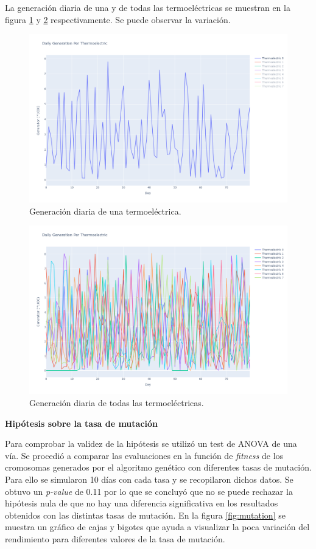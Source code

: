 \documentclass[twocolumn, fontsize=10pt]{article}
\begin{document}
La generación diaria de una y de todas las termoeléctricas se muestran en la figura \ref{fig:dailygenone} y \ref{fig:dailygenall} respectivamente. Se puede observar la variación.

\begin{figure}[H]
  \centering
  \includegraphics[width=\columnwidth]{assets/dailygenone.png}
  \caption{Generación diaria de una termoeléctrica.}
  \label{fig:dailygenone}
  \end{figure}

  \begin{figure}[H]
    \centering
    \includegraphics[width=\columnwidth]{assets/dailygenall.png}
    \caption{Generación diaria de todas las termoeléctricas.}
    \label{fig:dailygenall}
    \end{figure}

\textbf{Hipótesis sobre la tasa de mutación}

Para comprobar la validez de la hipótesis se utilizó un test de ANOVA de una vía. Se procedió a comparar 
las evaluaciones en la función de \textit{fitness} de los cromosomas generados por el algoritmo genético con diferentes tasas de mutación.
Para ello se simularon 10 días con cada tasa y se recopilaron dichos datos. Se obtuvo un \textit{p-value} de 0.11 por lo que se concluyó 
que no se puede rechazar la hipótesis nula de que no hay una diferencia significativa en los resultados obtenidos con las distintas tasas de mutación. 
En la figura \ref{fig:mutation} se muestra un gráfico de cajas y bigotes que ayuda a visualizar la  poca variación
del rendimiento para diferentes valores de la tasa de mutación.\\
\end{document}
